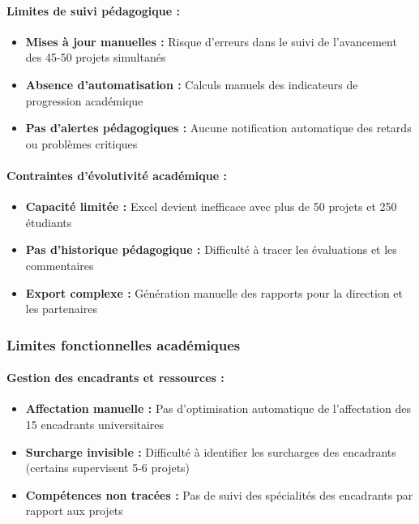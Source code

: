 \paragraph{Limites de suivi pédagogique :}
\begin{itemize}
    \item \textbf{Mises à jour manuelles :} Risque d'erreurs dans le suivi de l'avancement des 45-50 projets simultanés
    \item \textbf{Absence d'automatisation :} Calculs manuels des indicateurs de progression académique
    \item \textbf{Pas d'alertes pédagogiques :} Aucune notification automatique des retards ou problèmes critiques
\end{itemize}

\paragraph{Contraintes d'évolutivité académique :}
\begin{itemize}
    \item \textbf{Capacité limitée :} Excel devient inefficace avec plus de 50 projets et 250 étudiants
    \item \textbf{Pas d'historique pédagogique :} Difficulté à tracer les évaluations et les commentaires
    \item \textbf{Export complexe :} Génération manuelle des rapports pour la direction et les partenaires
\end{itemize}

\subsubsection{Limites fonctionnelles académiques}

\paragraph{Gestion des encadrants et ressources :}
\begin{itemize}
    \item \textbf{Affectation manuelle :} Pas d'optimisation automatique de l'affectation des 15 encadrants universitaires
    \item \textbf{Surcharge invisible :} Difficulté à identifier les surcharges des encadrants (certains supervisent 5-6 projets)
    \item \textbf{Compétences non tracées :} Pas de suivi des spécialités des encadrants par rapport aux projets
\end{itemize}

